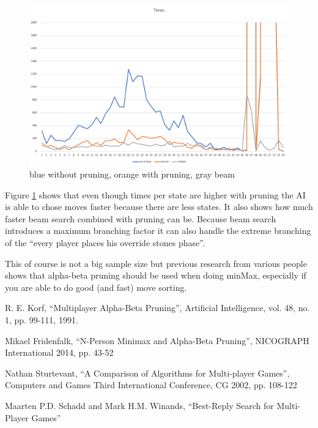 \documentclass[a4paper,12pt]{article}
\begin{document}
    \begin{figure}[h!]
        \centering
        \includegraphics[width = 14cm]{times.png}
        \caption{blue without pruning, orange with pruning, gray beam}
        \label{fig:time}
    \end{figure}
    Figure \ref{fig:time} shows that even though times per state are higher with pruning the AI is able to chose moves faster because there are less states. It also shows how much faster beam search combined with pruning can be. Because beam search introduces a maximum branching factor it can also handle the extreme branching of the ``every player places his override stones phase''.
    
    This of course is not a big sample size but previous research from various people shows that alpha-beta pruning should be used when doing minMax, especially if you are able to do good (and fast) move sorting.     
    \begin{thebibliography}{4}
         R. E. Korf, “Multiplayer Alpha-Beta Pruning”, Artificial Intelligence, vol. 48, no. 1, pp. 99-111, 1991. 
        
         Mikael Fridenfalk, “N-Person Minimax and Alpha-Beta Pruning”, NICOGRAPH International 2014, pp. 43-52 
        
         Nathan Sturtevant, “A Comparison of Algorithms for Multi-player Games”, Computers and Games Third International Conference, CG 2002, pp. 108-122
        
         Maarten P.D. Schadd and Mark H.M. Winands, “Best-Reply Search for Multi-Player Games”
    \end{thebibliography}
    
\end{document}
